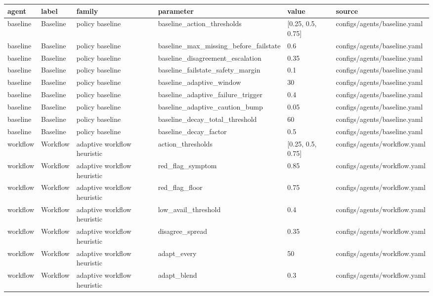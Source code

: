 \begin{tabular}{llllll}
\toprule
agent & label & family & parameter & value & source \\
\midrule
baseline & Baseline & policy baseline & baseline\_action\_thresholds & [0.25, 0.5, 0.75] & configs/agents/baseline.yaml \\
baseline & Baseline & policy baseline & baseline\_max\_missing\_before\_failstate & 0.6 & configs/agents/baseline.yaml \\
baseline & Baseline & policy baseline & baseline\_disagreement\_escalation & 0.35 & configs/agents/baseline.yaml \\
baseline & Baseline & policy baseline & baseline\_failstate\_safety\_margin & 0.1 & configs/agents/baseline.yaml \\
baseline & Baseline & policy baseline & baseline\_adaptive\_window & 30 & configs/agents/baseline.yaml \\
baseline & Baseline & policy baseline & baseline\_adaptive\_failure\_trigger & 0.4 & configs/agents/baseline.yaml \\
baseline & Baseline & policy baseline & baseline\_adaptive\_caution\_bump & 0.05 & configs/agents/baseline.yaml \\
baseline & Baseline & policy baseline & baseline\_decay\_total\_threshold & 60 & configs/agents/baseline.yaml \\
baseline & Baseline & policy baseline & baseline\_decay\_factor & 0.5 & configs/agents/baseline.yaml \\
workflow & Workflow & adaptive workflow heuristic & action\_thresholds & [0.25, 0.5, 0.75] & configs/agents/workflow.yaml \\
workflow & Workflow & adaptive workflow heuristic & red\_flag\_symptom & 0.85 & configs/agents/workflow.yaml \\
workflow & Workflow & adaptive workflow heuristic & red\_flag\_floor & 0.75 & configs/agents/workflow.yaml \\
workflow & Workflow & adaptive workflow heuristic & low\_avail\_threshold & 0.4 & configs/agents/workflow.yaml \\
workflow & Workflow & adaptive workflow heuristic & disagree\_spread & 0.35 & configs/agents/workflow.yaml \\
workflow & Workflow & adaptive workflow heuristic & adapt\_every & 50 & configs/agents/workflow.yaml \\
workflow & Workflow & adaptive workflow heuristic & adapt\_blend & 0.3 & configs/agents/workflow.yaml \\

\end{tabular}
